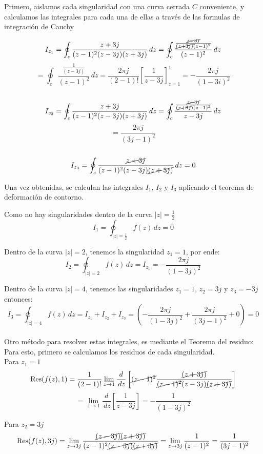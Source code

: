 \documentclass[12pt,a4paper]{report}
\begin{document}
\vspace{1cm}

Primero, aislamos cada singularidad con una curva cerrada $C$ conveniente, y calculamos las integrales para cada una de ellas a través de las formulas de integración 
de Cauchy\\
\begin{samepage}
$$I_{z_1} = \oint_{c}\frac{z+3j}{(z - 1)^2(z-3j)(z+3j)} \, dz =\oint_{c}\frac{\frac{\cancel{z+3j}}{\cancel{(z+3j)}(z-1)^2}}{(z-1)^2} \, dz$$
$$= \oint_{c}\frac{\frac{1}{(z-3j)}}{(z-1)^2} \, dz = \frac{2\pi j}{(2-1)!} \left[ \frac{1}{z-3j} \right]_{z=1}^1= -\frac{2\pi j}{(1-3i)^2}$$\\
$$I_{z_2} = \oint_{c}\frac{z+3j}{(z - 1)^2(z-3j)(z+3j)} \, dz =\oint_{c}\frac{\frac{\cancel{z+3j}}{\cancel{(z+3j)}(z-1)^2}}{z-3j} \, dz $$
$$=\frac{2\pi j}{(3j-1)^2}$$\\
$$I_{z_3} = \oint_{c}\frac{\cancel{z+3j}}{(z - 1)^2(z-3j)\cancel{(z+3j)}} \, dz=0$$
\end{samepage}

Una vez obtenidas, se calculan las integrales $I_1$, $I_2$ y $I_3$ aplicando el teorema de deformación de contorno.

Como no hay singularidades dentro de la curva $|z|=\frac{1}{2}$
$$I_1=\oint_{|z|=\frac{1}{2}}f(z) \, dz= 0$$

Dentro de la curva $|z|=2$, tenemos la singularidad $z_1=1$, por ende:
$$I_2=\oint_{|z|=2}f(z) \, dz = I_{z_1} = - \frac{2 \pi j}{(1-3j)^2}$$

Dentro de la curva $|z|=4$, tenemos las singularidades $z_1=1$, $z_2=3j$ y $z_3=-3j$ entonces:
$$I_3=\oint_{|z|=4}f(z) \, dz = I_{z_1}+I_{z_2}+I_{z_3} =( -\frac{2 \pi j }{(1-3j)^2} + \frac{2 \pi j}{(3j-1)^2} + 0) = 0$$\\

Otro método para resolver estas integrales, es mediante el Teorema del residuo:\\

Para esto, primero se calculamos los residuos de cada singularidad.\\

Para $z_1=1$
$$\text{Res}(f(z),1)=\frac{1}{(2-1)!} \lim_{z \to 1} \frac{d}{\,dz} \left[ \cancel{(z-1)^2} \frac{\cancel{(z+3j)}}{\cancel{(z-1)^2}(z-3j) \cancel{(z+3j)}} \right]$$
$$= \lim_{z \to 1} \frac{d}{\,dz} \left[ \frac{1}{z-3j} \right]=-\frac{1}{(1-3j)^2}$$

Para $z_2=3j$
$$\text{Res}(f(z),3j)= \lim_{z \to 3j} \frac{\cancel{(z-3j)}\cancel{(z+3j)}}{(z-1)^2\cancel{(z-3j)}\cancel{(z+3j)}}= \lim_{z \to 3j} \frac{1}{(z-1)^2}=\frac{1}{(3j-1)^2}$$
\end{document}
